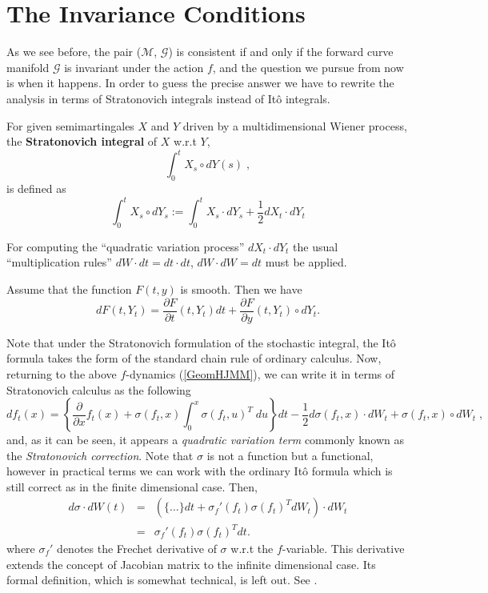 \section{The Invariance Conditions}
As we see before, the pair ($\mathcal{M}$, $\mathcal{G}$) is
consistent if and only if the forward curve manifold $\mathcal{G}$ is
invariant under the action $f$, and the question we pursue from now is
when it happens. In order to guess the precise answer we have to
rewrite the analysis in terms of Stratonovich integrals instead of
It\^o integrals.
\begin{defn}
For given semimartingales $X$ and $Y$ driven by a multidimensional
Wiener process, the {\bf Stratonovich integral} of $X$ w.r.t $Y$,  
$$
\int_0^t X_s \circ dY(s)\;,
$$ 
is defined as
$$
\int_0^t X_s \circ dY_s :=\int_0^t X_s \cdot dY_s+\frac{1}{2} dX_t
\cdot dY_t
$$
\end{defn}
\begin{rmk} For computing the ``quadratic variation process'' $dX_t
  \cdot dY_t$ the usual ``multiplication rules'' $dW \cdot dt=dt \cdot
  dt$, $dW\cdot dW=dt$ must be applied.
\end{rmk}
\begin{propos} Assume that the function $F(t,y)$ is
  smooth. Then we have
$$
dF(t,Y_t)=\frac{\partial F }{\partial t}(t,Y_t) dt+\frac{\partial F
}{\partial y}(t,Y_t) \circ dY_t.
$$
\end{propos}
Note that under the Stratonovich formulation of the stochastic
integral, the It\^o formula takes the form of the standard chain rule
of ordinary calculus. Now, returning to the above $f$-dynamics
(\ref{GeomHJMM}), we can write it in terms of Stratonovich calculus as
the following 
\begin{equation}
\label{GeomHJMMStrat}
df_t(x)=\left\{\frac{\partial}{\partial
    x}f_t(x)+\sigma(f_t,x)\int_0^x \sigma(f_t,u)^T\; du \right\} dt -
\frac{1}{2} d\sigma(f_t,x) \cdot dW_t +\sigma(f_t,x) \circ dW_t\;,
\end{equation}
and, as it can be seen, it appears a {\sl quadratic variation term}
commonly known as the {\sl Stratonovich correction}. Note that $\sigma$ is
not a function but a functional, however in practical terms we can
work with the ordinary It\^o formula which is still correct as in the
finite dimensional case. Then,  
\begin{equation}
\begin{array}{rcl}
d \sigma \cdot dW(t)&=&\left(\{ \dots\}dt+\sigma_f'(f_t) \sigma(f_t)^T
  dW_t\right)\cdot dW_t\\
&=& \sigma_f'(f_t) \sigma(f_t)^T dt.
\end{array}
\end{equation}
where $\sigma_f'$ denotes the Frechet derivative of $\sigma$ w.r.t the
$f$-variable. This derivative extends the concept of Jacobian matrix
to the infinite dimensional case. Its formal definition, which is
somewhat technical, is left out. See \cite{PZ:1992}.

